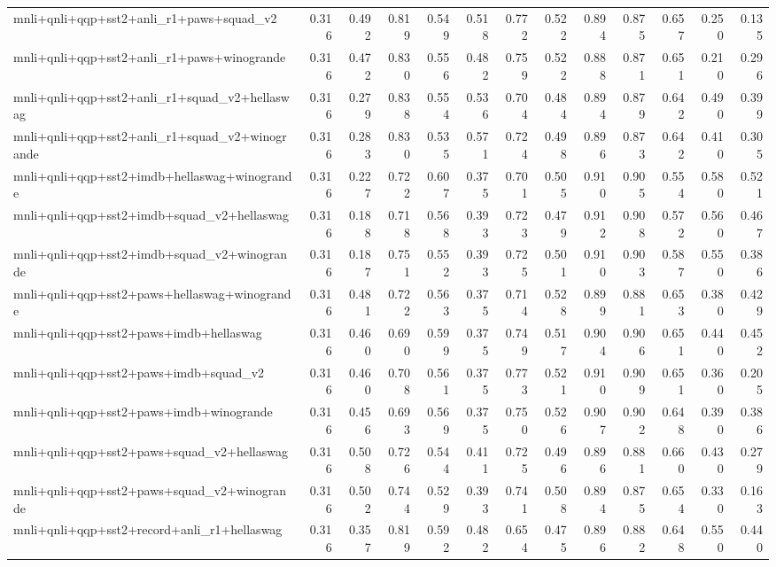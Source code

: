 \begin{table}[t]
\begin{tabular}{lrrrrrrrrrrrr}
    mnli+qnli+qqp+sst2+anli\_r1+paws+squad\_v2 & 0.316 & 0.492 & 0.819 & 0.549 & 0.518 & 0.772 & 0.522 & 0.894 & 0.875 & 0.657 & 0.250 & 0.135 \\
    mnli+qnli+qqp+sst2+anli\_r1+paws+winogrande & 0.316 & 0.472 & 0.830 & 0.556 & 0.482 & 0.759 & 0.522 & 0.888 & 0.871 & 0.651 & 0.210 & 0.296 \\
    mnli+qnli+qqp+sst2+anli\_r1+squad\_v2+hellaswag & 0.316 & 0.279 & 0.838 & 0.554 & 0.536 & 0.704 & 0.484 & 0.894 & 0.879 & 0.642 & 0.490 & 0.399 \\
    mnli+qnli+qqp+sst2+anli\_r1+squad\_v2+winogrande & 0.316 & 0.283 & 0.830 & 0.535 & 0.571 & 0.724 & 0.498 & 0.896 & 0.873 & 0.642 & 0.410 & 0.305 \\
    mnli+qnli+qqp+sst2+imdb+hellaswag+winogrande & 0.316 & 0.227 & 0.722 & 0.607 & 0.375 & 0.701 & 0.505 & 0.910 & 0.905 & 0.554 & 0.580 & 0.521 \\
    mnli+qnli+qqp+sst2+imdb+squad\_v2+hellaswag & 0.316 & 0.188 & 0.718 & 0.568 & 0.393 & 0.723 & 0.479 & 0.912 & 0.908 & 0.572 & 0.560 & 0.467 \\
    mnli+qnli+qqp+sst2+imdb+squad\_v2+winogrande & 0.316 & 0.187 & 0.751 & 0.552 & 0.393 & 0.725 & 0.501 & 0.910 & 0.903 & 0.587 & 0.550 & 0.386 \\
    mnli+qnli+qqp+sst2+paws+hellaswag+winogrande & 0.316 & 0.481 & 0.722 & 0.563 & 0.375 & 0.714 & 0.528 & 0.899 & 0.881 & 0.653 & 0.380 & 0.429 \\
    mnli+qnli+qqp+sst2+paws+imdb+hellaswag & 0.316 & 0.460 & 0.690 & 0.599 & 0.375 & 0.749 & 0.517 & 0.904 & 0.906 & 0.651 & 0.440 & 0.452 \\
    mnli+qnli+qqp+sst2+paws+imdb+squad\_v2 & 0.316 & 0.460 & 0.708 & 0.561 & 0.375 & 0.773 & 0.521 & 0.910 & 0.909 & 0.651 & 0.360 & 0.205 \\
    mnli+qnli+qqp+sst2+paws+imdb+winogrande & 0.316 & 0.456 & 0.693 & 0.569 & 0.375 & 0.750 & 0.526 & 0.907 & 0.902 & 0.648 & 0.390 & 0.386 \\
    mnli+qnli+qqp+sst2+paws+squad\_v2+hellaswag & 0.316 & 0.508 & 0.726 & 0.544 & 0.411 & 0.725 & 0.496 & 0.896 & 0.881 & 0.660 & 0.430 & 0.279 \\
    mnli+qnli+qqp+sst2+paws+squad\_v2+winogrande & 0.316 & 0.502 & 0.744 & 0.529 & 0.393 & 0.741 & 0.508 & 0.894 & 0.875 & 0.654 & 0.330 & 0.163 \\
    mnli+qnli+qqp+sst2+record+anli\_r1+hellaswag & 0.316 & 0.357 & 0.819 & 0.592 & 0.482 & 0.654 & 0.475 & 0.896 & 0.882 & 0.648 & 0.550 & 0.440 \\

\end{tabular}
\end{table}
